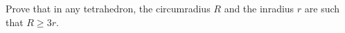 Prove that in any tetrahedron,
the circumradius $R$ and the inradius $r$
are such that $R \geq 3 r$.
